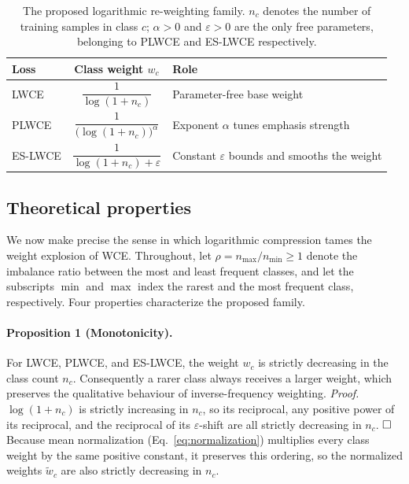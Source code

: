\documentclass[a4paper,fleqn]{cas-sc}
\begin{document}
\begin{table}[pos=h]
\centering
\caption{The proposed logarithmic re-weighting family. $n_c$ denotes the number
of training samples in class $c$; $\alpha>0$ and $\varepsilon>0$ are the only
free parameters, belonging to PLWCE and ES-LWCE respectively.}
\label{tab:losses}
\begin{tabular}{lcl}
\toprule
Loss & Class weight $w_c$ & Role \\
\midrule
LWCE   & $\dfrac{1}{\log(1+n_c)}$             & Parameter-free base weight \\[1.4ex]
PLWCE  & $\dfrac{1}{\big(\log(1+n_c)\big)^{\alpha}}$ & Exponent $\alpha$ tunes emphasis strength \\[1.4ex]
ES-LWCE & $\dfrac{1}{\log(1+n_c)+\varepsilon}$ & Constant $\varepsilon$ bounds and smooths the weight \\
\bottomrule
\end{tabular}
\end{table}

\subsection{Theoretical properties}
We now make precise the sense in which logarithmic compression tames the weight
explosion of WCE. Throughout, let $\rho = n_{\max}/n_{\min} \ge 1$ denote the
imbalance ratio between the most and least frequent classes, and let the
subscripts $\min$ and $\max$ index the rarest and the most frequent class,
respectively. Four properties characterize the proposed family.

\paragraph{Proposition 1 (Monotonicity).}
For LWCE, PLWCE, and ES-LWCE, the weight $w_c$ is strictly decreasing in the class
count $n_c$. Consequently a rarer class always receives a larger weight, which
preserves the qualitative behaviour of inverse-frequency weighting.
\emph{Proof.} $\log(1+n_c)$ is strictly increasing in $n_c$, so its reciprocal,
any positive power of its reciprocal, and the reciprocal of its $\varepsilon$-shift
are all strictly decreasing in $n_c$. $\hfill\square$
Because mean normalization (Eq.~\eqref{eq:normalization}) multiplies every class
weight by the same positive constant, it preserves this ordering, so the normalized
weights $\widetilde{w}_c$ are also strictly decreasing in $n_c$.
\end{document}
